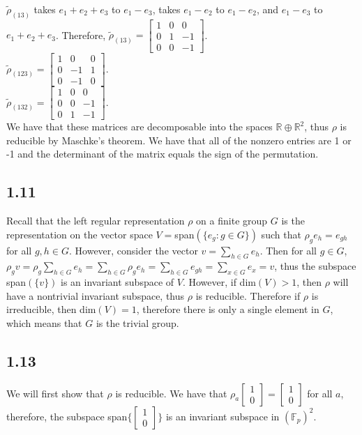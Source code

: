\documentclass[]{article}
\begin{document}
$\tilde{\rho}_{(13)}$ takes $e_1 + e_2 + e_3$ to $e_1 - e_3$, takes $e_1 - e_2$ to $e_1 - e_2$, and $e_1 - e_3$ to $e_1 + e_2 + e_3$. Therefore, 
$\tilde{\rho}_{(13)} = 
\begin{bmatrix}
	1 & 0 & 0\\
	0 & 1 & -1\\
	0 & 0 & -1
\end{bmatrix}
$.
\\
$\tilde{\rho}_{(123)} = 
\begin{bmatrix}
	1 & 0 & 0\\
	0 & -1 & 1\\
	0 & -1 & 0
\end{bmatrix}
$.
\\
$\tilde{\rho}_{(132)} = 
\begin{bmatrix}
	1 & 0 & 0\\
	0 & 0 & -1\\
	0 & 1 & -1
\end{bmatrix}
$.
\\
We have that these matrices are decomposable into the spaces $\mathbb{R} \oplus \mathbb{R}^2$, thus $\rho$ is reducible by Maschke's theorem. We have that all of the nonzero entries are 1 or -1 and the determinant of the matrix equals the sign of the permutation.

\subsection*{1.11}
Recall that the left regular representation $\rho$ on a finite group $G$ is the representation on the vector space $V=$span$(\lbrace e_g : g \in G \rbrace)$ such that $\rho_g e_h = e_{gh}$ for all $g, h \in G$. However, consider the vector $v = \sum_{h \in G} e_h$. Then for all $g \in G$, $\rho_g v = \rho_g \sum_{h \in G} e_h = \sum_{h \in G} \rho_g e_h = \sum_{h \in G} e_{gh} = \sum_{x \in G} e_x = v$, thus the subspace span$(\lbrace v \rbrace)$ is an invariant subspace of $V$. However, if dim$(V) > 1$, then $\rho$ will have a nontrivial invariant subspace, thus $\rho$ is reducible. Therefore if $\rho$ is irreducible, then dim$(V) = 1$, therefore there is only a single element in $G$, which means that $G$ is the trivial group.
\subsection*{1.13}
We will first show that $\rho$ is reducible. We have that $\rho_a \begin{bmatrix}
	1\\
	0
\end{bmatrix}
= \begin{bmatrix}
	1\\
	0
\end{bmatrix}
$ for all $a$, therefore, the subspace span$\lbrace \begin{bmatrix}
	1\\
	0
\end{bmatrix} \rbrace$ is an invariant subspace in $(\mathbb{F}_p)^2$. 
\end{document}
